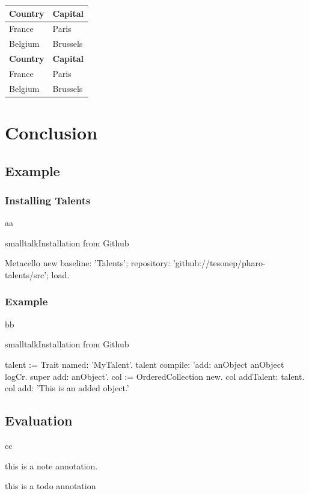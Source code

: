 \documentclass[10pt,twoside,english]{_support/latex/sbabook/sbabook}
\begin{document}
\begin{tabular}{ll}
\toprule
\textbf{Country} & \textbf{Capital} \\
\midrule
France & Paris \\
Belgium & Brussels \\
\textbf{Country} & \textbf{Capital} \\
\midrule
France & Paris \\
Belgium & Brussels \\
\bottomrule
\end{tabular}
\chapter{Conclusion}\section{Example}\subsection{Installing Talents}
aa

\begin{listing}[float, label=install]{smalltalk}{Installation from Github}

Metacello new
  baseline: 'Talents';
  repository: 'github://tesonep/pharo-talents/src';
  load.
\end{listing}
\subsection{Example}
bb

\begin{listing}[float, label=talent-example]{smalltalk}{Installation from Github}

talent := Trait named: 'MyTalent'.
talent compile: 'add: anObject
anObject logCr.
super add: anObject'.
col := OrderedCollection new.
col addTalent: talent.
col add: 'This is an added object.'
\end{listing}
\section{Evaluation}
cc

\begin{note}
this is a note annotation.
\end{note}

\begin{todo}
this is a todo annotation
\end{todo}
\end{document}
